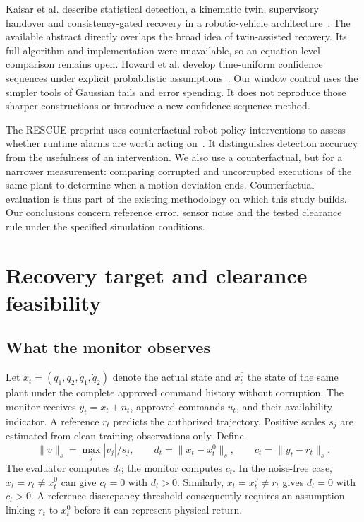 \documentclass[11pt]{article}
\begin{document}
Kaisar et al. describe statistical detection, a kinematic twin, supervisory handover and consistency-gated recovery in a robotic-vehicle architecture~\cite{kaisar}. The available abstract directly overlaps the broad idea of twin-assisted recovery. Its full algorithm and implementation were unavailable, so an equation-level comparison remains open. Howard et al. develop time-uniform confidence sequences under explicit probabilistic assumptions~\cite{howard}. Our window control uses the simpler tools of Gaussian tails and error spending. It does not reproduce those sharper constructions or introduce a new confidence-sequence method.

The RESCUE preprint uses counterfactual robot-policy interventions to assess whether runtime alarms are worth acting on~\cite{rescue}. It distinguishes detection accuracy from the usefulness of an intervention. We also use a counterfactual, but for a narrower measurement: comparing corrupted and uncorrupted executions of the same plant to determine when a motion deviation ends. Counterfactual evaluation is thus part of the existing methodology on which this study builds. Our conclusions concern reference error, sensor noise and the tested clearance rule under the specified simulation conditions.

\section{Recovery target and clearance feasibility}
\subsection{What the monitor observes}
Let $x_t=(q_1,q_2,\dot q_1,\dot q_2)$ denote the actual state and $x_t^0$ the state of the same plant under the complete approved command history without corruption. The monitor receives $y_t=x_t+n_t$, approved commands $u_t$, and their availability indicator. A reference $r_t$ predicts the authorized trajectory. Positive scales $s_j$ are estimated from clean training observations only. Define
\begin{equation}
 \|v\|_s=\max_j |v_j|/s_j,\qquad
 d_t=\|x_t-x_t^0\|_s,\qquad c_t=\|y_t-r_t\|_s.
 \label{eq:discrepancies}
\end{equation}
The evaluator computes $d_t$; the monitor computes $c_t$. In the noise-free case, $x_t=r_t\ne x_t^0$ can give $c_t=0$ with $d_t>0$. Similarly, $x_t=x_t^0\ne r_t$ gives $d_t=0$ with $c_t>0$. A reference-discrepancy threshold consequently requires an assumption linking $r_t$ to $x_t^0$ before it can represent physical return.
\end{document}
